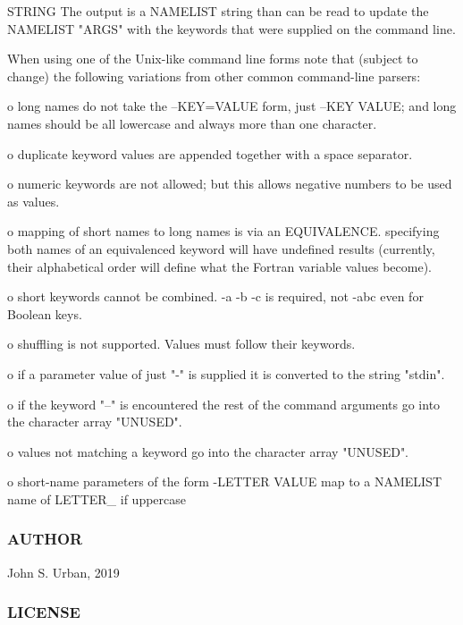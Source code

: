 \begin{DoxyVerb}  STRING   The output is a NAMELIST string than can be read to update
           the NAMELIST "ARGS" with the keywords that were supplied on
           the command line.

  When using one of the Unix-like command line forms note that
  (subject to change) the following variations from other common
  command-line parsers:

     o long names do not take the --KEY=VALUE form, just
       --KEY VALUE; and long names should be all lowercase and
       always more than one character.

     o duplicate keyword values are appended together with a space
       separator.

     o numeric keywords are not allowed; but this allows
       negative numbers to be used as values.

     o mapping of short names to long names is via an EQUIVALENCE.
       specifying both names of an equivalenced keyword will have
       undefined results (currently, their alphabetical order
       will define what the Fortran variable values become).

     o short keywords cannot be combined. -a -b -c is required,
       not -abc even for Boolean keys.

     o shuffling is not supported. Values must follow their
       keywords.

     o if a parameter value of just "-" is supplied it is
       converted to the string "stdin".

     o if the keyword "--" is encountered the rest of the
       command arguments go into the character array "UNUSED".

     o values not matching a keyword go into the character
       array "UNUSED".

     o short-name parameters of the form -LETTER VALUE
       map to a NAMELIST name of LETTER_ if uppercase
\end{DoxyVerb}


\subsubsection*{A\+U\+T\+H\+OR}

John S. Urban, 2019 \subsubsection*{L\+I\+C\+E\+N\+SE}

